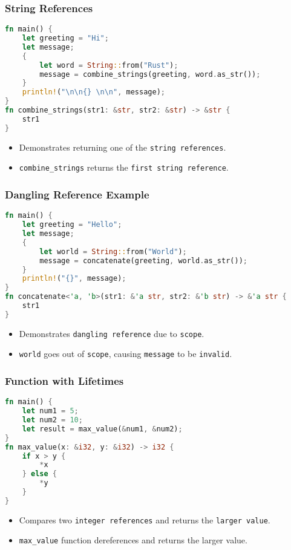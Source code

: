 \documentclass[aspectratio=169, table]{beamer}
\begin{document}
\begin{frame}[fragile]
\frametitle{String References}
\vspace{15pt}
\begin{lstlisting}[language=Rust]
fn main() {
	let greeting = "Hi";
	let message;
	{
		let word = String::from("Rust");
		message = combine_strings(greeting, word.as_str());
	}
	println!("\n\n{} \n\n", message);
}
fn combine_strings(str1: &str, str2: &str) -> &str {
	str1
}
\end{lstlisting}
\begin{itemize}
\item Demonstrates returning one of the \texttt{string references}.
\item \texttt{combine\_strings} returns the \texttt{first string reference}.
\end{itemize}
\end{frame}

\begin{frame}[fragile]
\frametitle{Dangling Reference Example}
\vspace{15pt}
\begin{lstlisting}[language=Rust]
fn main() {
	let greeting = "Hello";
	let message;
	{
		let world = String::from("World");
		message = concatenate(greeting, world.as_str());
	}
	println!("{}", message);
}
fn concatenate<'a, 'b>(str1: &'a str, str2: &'b str) -> &'a str {
	str1
}
\end{lstlisting}
\begin{itemize}
\item Demonstrates \texttt{dangling\ reference} due to \texttt{scope}.
\item \texttt{world} goes out of \texttt{scope}, causing \texttt{message} to be \texttt{invalid}.
\end{itemize}
\end{frame}

\begin{frame}[fragile]
\frametitle{Function with Lifetimes}
\vspace{15pt}
\begin{lstlisting}[language=Rust]
fn main() {
	let num1 = 5;
	let num2 = 10;
	let result = max_value(&num1, &num2);
}
fn max_value(x: &i32, y: &i32) -> i32 {
	if x > y {
		*x
	} else {
		*y
	}
}
\end{lstlisting}
\begin{itemize}
\item Compares two \texttt{integer\ references} and returns the \texttt{larger\ value}.
\item \texttt{max\_value} function dereferences and returns the larger value.
\end{itemize}
\end{frame}
\end{document}
